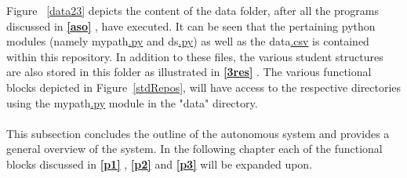 Figure ~\ref{data23} depicts the content of the data folder, after all the programs discussed in \textbf{\ref{aso} }, have executed. It can be seen that the pertaining python modules (namely mypath\hyperref[listExt]{.py} and ds\hyperref[listExt]{.py}) as well as the data\hyperref[listExt]{.csv} is contained within this repository. In addition to these files, the various student structures are also stored in this folder as illustrated in \textbf{\ref{3res} }. The various functional blocks depicted in Figure~\ref{stdRepos}, will have access to the respective directories using the mypath\hyperref[listExt]{.py} module in the "data" directory.
\\\\
This subsection concludes the outline of the autonomous system and provides a general overview of the system. In the following chapter each of the functional blocks discussed in \textbf{\ref{p1} }, \textbf{\ref{p2} } and \textbf{\ref{p3} } will be expanded upon.
